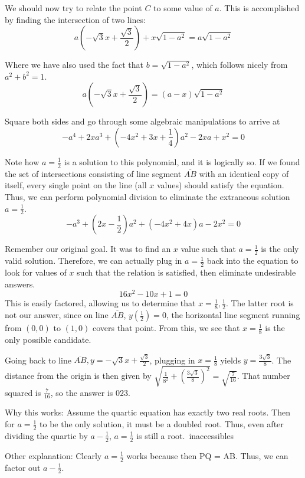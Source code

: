 \begin{enumerate}
 We should now try to relate the point $C$ to some value of $a$. This is accomplished by finding the intersection of two lines: 
 \[     a\left(-\sqrt{3}x +\frac{\sqrt{3}}{2}\right) + x\sqrt{1-a^2} = a\sqrt{1-a^2} \]

 Where we have also used the fact that $b=\sqrt{1-a^2}$, which follows nicely from $a^2+b^2 =1$.  
 \[     a\left(-\sqrt{3}x +\frac{\sqrt{3}}{2}\right)   = (a-x)\sqrt{1-a^2} \]

 Square both sides and go through some algebraic manipulations to arrive at 
 \[     -a^4 +2xa^3+\left(-4x^2+3x+\frac{1}{4}\right)a^2-2xa+x^2=0 \]

 Note how $a=\frac{1}{2}$ is a solution to this polynomial, and it is logically so. If we found the set of intersections consisting of line segment $\overline{AB}$ with an identical copy of itself, every single point on the line (all $x$ values) should satisfy the equation. Thus, we can perform polynomial division to eliminate the extraneous solution $a=\frac{1}{2}$. 
 \[     -a^3 + \left(2x-\frac{1}{2}\right)a^2+(-4x^2+4x)a-2x^2=0 \]

 Remember our original goal. It was to find an $x$ value such that $a=\frac{1}{2}$ is the only valid solution. Therefore, we can actually plug in $a=\frac{1}{2}$ back into the equation to look for values of $x$ such that the relation is satisfied, then eliminate undesirable answers.
 \[     16x^2-10x+1=0 \]This is easily factored, allowing us to determine that $x=\frac{1}{8},\frac{1}{2}$. The latter root is not our answer, since on line $\overline{AB}$, $y\left(\frac{1}{2}\right)=0$, the horizontal line segment running from $(0,0)$ to $(1,0)$ covers that point. From this, we see that $x=\frac{1}{8}$ is the only possible candidate.

 Going back to line $\overline{AB}, y= -\sqrt{3}x+\frac{\sqrt{3}}{2}$, plugging in $x=\frac{1}{8}$ yields $y=\frac{3\sqrt{3}}{8}$. The distance from the origin is then given by $\sqrt{\frac{1}{8^2}+\left(\frac{3\sqrt{3}}{8}\right)^2} =\sqrt{\frac{7}{16}}$. That number squared is $\frac{7}{16}$, so the answer is $\boxed{023}$. 

 


 Why this works: Assume the quartic equation has exactly two real roots. Then for $a=\frac{1}{2}$ to be the only solution, it must be a doubled root. Thus, even after dividing the quartic by $a-\frac{1}{2}$, $a=\frac{1}{2}$ is still a root.~inaccessibles

 
Other explanation: Clearly $a=\frac{1}{2}$ works because then PQ = AB. Thus, we can factor out $a-\frac{1}{2}$. 


\end{enumerate}
